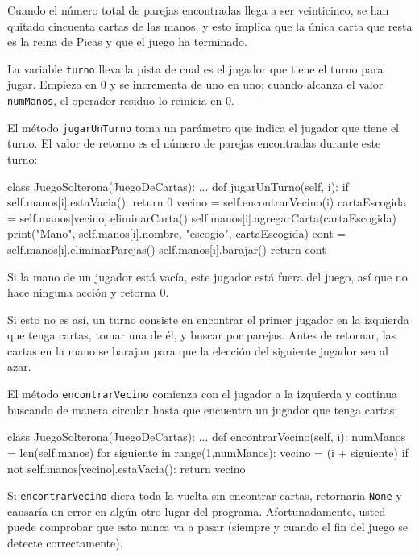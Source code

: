 
Cuando el número total de parejas encontradas llega a ser veinticinco,
se han quitado cincuenta cartas de las manos, y esto implica que la
única carta que resta es la reina de Picas y que el juego ha terminado.

La variable \texttt{turno} lleva la pista de cual es el jugador que
tiene el turno para jugar. Empieza en 0 y se incrementa de uno en
uno; cuando alcanza el valor \texttt{numManos}, el operador residuo
lo reinicia en 0.

El método \texttt{jugarUnTurno} toma un parámetro que indica el jugador
que tiene el turno. El valor de retorno es el número de parejas encontradas
durante este turno:

\begin{pythoncode}
class JuegoSolterona(JuegoDeCartas):
  ...
  def jugarUnTurno(self, i):
    if self.manos[i].estaVacia():
      return 0
    vecino = self.encontrarVecino(i)
    cartaEscogida = self.manos[vecino].eliminarCarta()
    self.manos[i].agregarCarta(cartaEscogida)
    print("Mano", self.manos[i].nombre, 
          "escogio", cartaEscogida)
    cont = self.manos[i].eliminarParejas()
    self.manos[i].barajar()
    return cont
\end{pythoncode}
 Si la mano de un jugador está vacía, este jugador está fuera del
juego, así que no hace ninguna acción y retorna 0.

Si esto no es así, un turno consiste en encontrar el primer jugador
en la izquierda que tenga cartas, tomar una de él, y buscar por parejas.
Antes de retornar, las cartas en la mano se barajan para que la elección
del siguiente jugador sea al azar.

El método \texttt{encontrarVecino} comienza con el jugador a la izquierda
y continua buscando de manera circular hasta que encuentra un jugador
que tenga cartas:
\begin{pythoncode}
class JuegoSolterona(JuegoDeCartas):
  ...
  def encontrarVecino(self, i):
    numManos = len(self.manos)
    for siguiente in range(1,numManos):
      vecino = (i + siguiente) %
      if not self.manos[vecino].estaVacia():
        return vecino
\end{pythoncode}

Si \texttt{encontrarVecino} diera toda la vuelta sin encontrar cartas,
retornaría \texttt{None} y causaría un error en algún otro lugar del
programa. Afortunadamente, usted puede comprobar que esto nunca va
a pasar (siempre y cuando el fin del juego se detecte correctamente).

